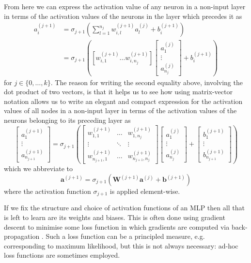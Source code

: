 \documentclass[11pt]{article}
\begin{document}
\noindent From here we can express the activation value of any neuron in a non-input layer in terms of the activation values of the neurons in the layer which precedes it as
\begin{align*}
    a_i^{(j+1)}
    &=
    \sigma_{j+1}\left(
    \sum_{l=1}^{n_j} w_{i,l}^{(j+1)}a_l^{(j)} + b_i^{(j+1)}
    \right)\\
    &=
    \sigma_{j+1}\left(
    \left[w_{i,1}^{(j+1)} \dots w_{i,n_j}^{(j+1)}\right]
    \begin{bmatrix}
        a_1^{(j)}\\
        \vdots\\
        a_{n_j}^{(j)}
    \end{bmatrix}
    +
    b_i^{(j+1)}
\right)
\end{align*}
for $j\in\{0,\dots,k\}$. The reason for writing the second equality above, involving the dot product of two vectors, is that it helps us to see how using matrix-vector notation allows us to write an elegant and compact expression for the activation values of all nodes in a non-input layer in terms of the activation values of the neurons belonging to its preceding layer as
$$
\begin{bmatrix}
    a_1^{(j+1)}\\
    \vdots\\
    a_{n_{j+1}}^{(j+1)}
\end{bmatrix}
=
\sigma_{j+1}\left(
\begin{bmatrix}
    w_{1,1}^{(j+1)} & \dots & w_{1,n_j}^{(j+1)}\\
    \vdots & \ddots & \vdots\\
    w_{n_{j+1},1}^{(j+1)} & \dots & w_{n_{j+1},n_j}^{(j+1)}
\end{bmatrix}
\begin{bmatrix}
    a_1^{(j)}\\
    \vdots\\
    a_{n_j}^{(j)}
\end{bmatrix}
+
\begin{bmatrix}
    b_1^{(j+1)}\\
    \vdots\\
    b_{n_{j+1}}^{(j+1)}
\end{bmatrix}
\right)
$$
which we abbreviate to
$$
\mathbf{a}^{(j+1)}=\sigma_{j+1}\left(\mathbf{W}^{(j+1)}\mathbf{a}^{(j)}+\mathbf{b}^{(j+1)}\right)
$$
where the activation function $\sigma_{j+1}$ is applied element-wise.

If we fix the structure and choice of activation functions of an MLP then all that is left to learn are its weights and biases. This is often done using gradient descent to minimise some loss function in which gradients are computed via back-propagation \cite{backpropagation}. Such a loss function can be a principled measure, e.g. corresponding to maximum likelihood, but this is not always necessary: ad-hoc loss functions are sometimes employed.
\end{document}
